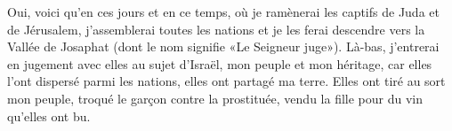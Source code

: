 Oui, voici qu’en ces jours et en ce temps,
	où je ramènerai les captifs de Juda et de Jérusalem,
	j’assemblerai toutes les nations et je les ferai descendre vers la Vallée de Josaphat
	(dont le nom signifie «Le Seigneur juge»).
Là-bas, j’entrerai en jugement avec elles au sujet d’Israël, mon peuple et mon héritage,
	car elles l’ont dispersé parmi les nations, elles ont partagé ma terre.
Elles ont tiré au sort mon peuple,
	troqué le garçon contre la prostituée, vendu la fille pour du vin qu’elles ont bu.
